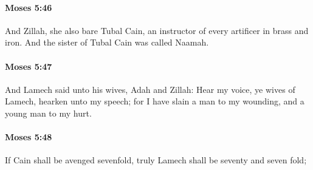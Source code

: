 		\paragraph{Moses 5:46} %
			\label{MOSES-5-46}

			And Zillah, she also bare Tubal Cain, an instructor of every artificer in brass and iron. And the sister of Tubal Cain was called Naamah.


		\paragraph{Moses 5:47} %
			\label{MOSES-5-47}

			And Lamech said unto his wives, Adah and Zillah: Hear my voice, ye wives of Lamech, hearken unto my speech; for I have slain a man to my wounding, and a young man to my hurt.


		\paragraph{Moses 5:48} %
			\label{MOSES-5-48}

			If Cain shall be avenged sevenfold, truly Lamech shall be seventy and seven fold;


